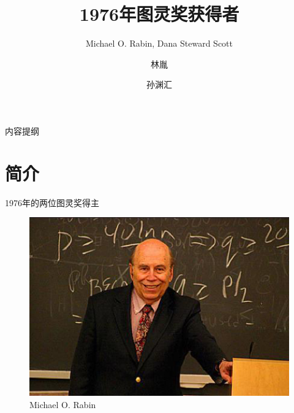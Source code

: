 \documentclass{beamer}
\title[图灵奖获得者介绍] %
{1976年图灵奖获得者}
\subtitle
{Michael O. Rabin,  Dana Steward Scott}
\author[ly \and syh]%
{林胤\and 孙渊汇}
\institute
{
  同济大学电子与信息学院
}
\begin{document}
\begin{frame}
  \titlepage %
\end{frame}
\begin{frame}{内容提纲}
  \tableofcontents
\end{frame}

\section{简介}
\begin{frame}{1976年的两位图灵奖得主}
	\begin{figure}[htbp]
		\begin{minipage}{0.4\textwidth}
			\centering\includegraphics[scale=0.3]{figures/lb2.eps}
			\caption*{Michael O. Rabin}
		\end{minipage}
		\begin{minipage}{0.4\textwidth}

\end{minipage}
\end{figure}
\end{frame}
\end{document}
